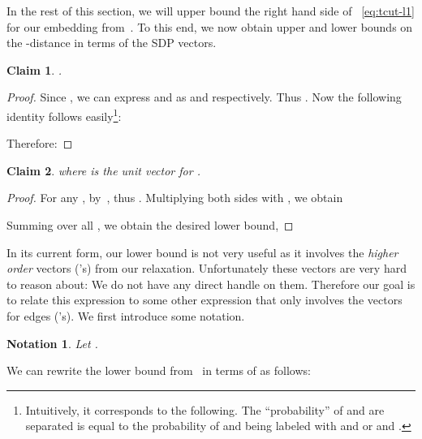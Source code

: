 \documentclass{article}
\newtheorem{claim}{Claim}[section]
\newtheorem{notation}{Notation}[section]
\begin{document}
In the rest of this section, we will upper bound the right hand side
of ~\cref{eq:tcut-l1} for our embedding
from~. To this end, we now obtain upper and
lower bounds on the -distance  in terms of the SDP vectors.

\begin{claim} \label{clm:l1-ub} .
\end{claim}
\begin{proof}
  Since , we can express 
  and  as  and
   respectively.  Thus
  .
Now the following identity follows easily\footnote{ Intuitively, it
    corresponds to the following.  The ``probability'' of  and 
    are separated is equal to the probability of  and  being
    labeled with  and  or  and .  }:
  
Therefore:
  
\end{proof}
\begin{claim}\label{clm:l1-lb}
   where  is the unit vector for
  .
\end{claim}
\begin{proof}
For any , 
by~,  thus
.  
Multiplying both sides with
, we obtain

Summing over all , we obtain the desired lower
bound,

\end{proof}
In its current form, our lower bound is not very useful as it involves
the {\em higher order} vectors ('s) from our
relaxation.  Unfortunately these vectors are very hard to reason
about: We do not have any direct handle on them.  Therefore our goal
is to relate this expression to some other expression that only
involves the vectors for edges ('s). We first
introduce some notation.
\begin{notation}
  Let .
\end{notation}
We can rewrite the lower bound from~ 
in terms of  as follows:
\end{document}
